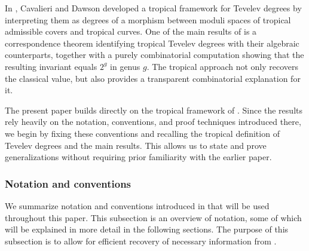 \documentclass[11pt,reqno]{amsart}
\newtheorem{theorem}{Theorem}[section]
\theoremstyle{definition}
\newcommand\trop{{\mathtt{trop}}}
\newcommand{\Tev}{{\mathsf{Tev}}}
\begin{document}
 

In \cite{troptev}, Cavalieri and Dawson developed a tropical framework for Tevelev
degrees by interpreting them as degrees of a morphism between moduli spaces of tropical
admissible covers and tropical curves. One of the main results of \cite{troptev} is a
correspondence theorem identifying tropical Tevelev degrees with their algebraic
counterparts, together with a purely combinatorial computation showing that the
resulting invariant equals $2^g$ in genus $g$. The tropical approach not only recovers
the classical value, but also provides a transparent combinatorial explanation for it.

The present paper builds directly on the tropical framework of \cite{troptev}. Since the
results rely heavily on the notation, conventions, and proof techniques introduced
there, we begin by fixing these conventions and recalling the tropical definition of
Tevelev degrees and the main results. This allows us to state and prove
generalizations without requiring prior familiarity with the earlier paper.


\subsubsection{Notation and conventions}
We summarize notation and conventions introduced in \cite{troptev} that will be used
throughout this paper. This subsection is an overview of notation, some of which will be explained in more detail in the following sections. The purpose of this subsection is to allow for efficient recovery of necessary information from \cite{troptev}. 
\end{document}
